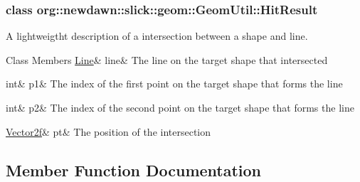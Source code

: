\subsubsection{class org\+:\+:newdawn\+:\+:slick\+:\+:geom\+:\+:Geom\+Util\+:\+:Hit\+Result}
A lightweigtht description of a intersection between a shape and line. \begin{DoxyFields}{Class Members}
\mbox{\label{classorg_1_1newdawn_1_1slick_1_1geom_1_1_geom_util_a8e928354f1df803200a66b43cf6d7e36}} 
\mbox{\hyperlink{classorg_1_1newdawn_1_1slick_1_1geom_1_1_line}{Line}}&
line&
The line on the target shape that intersected \\
\hline

\mbox{\label{classorg_1_1newdawn_1_1slick_1_1geom_1_1_geom_util_aefa8690b70f245566e0714efec844afb}} 
int&
p1&
The index of the first point on the target shape that forms the line \\
\hline

\mbox{\label{classorg_1_1newdawn_1_1slick_1_1geom_1_1_geom_util_ae0c6b788e10bba28e7abd41560acb335}} 
int&
p2&
The index of the second point on the target shape that forms the line \\
\hline

\mbox{\label{classorg_1_1newdawn_1_1slick_1_1geom_1_1_geom_util_a4ccc51133cd07ee1d604c9c84ec3a30b}} 
\mbox{\hyperlink{classorg_1_1newdawn_1_1slick_1_1geom_1_1_vector2f}{Vector2f}}&
pt&
The position of the intersection \\
\hline

\end{DoxyFields}


\subsection{Member Function Documentation}
\mbox{\label{classorg_1_1newdawn_1_1slick_1_1geom_1_1_geom_util_a3f61c5128808d5737d963c353910d3e5}} 
